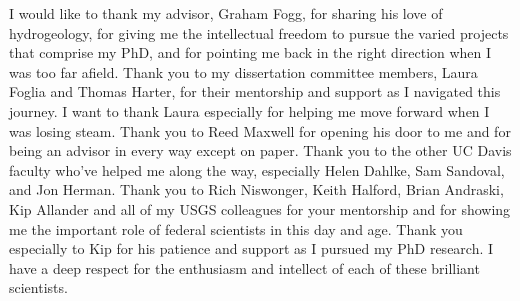 \begin{frontmatter}
\maketitle

\copyrightpage


\tableofcontents
\listoffigures
\listoftables

    \newpage
    \begin{inlineabstract}
		\myabstract
		
    \end{inlineabstract}

\begin{acknowledgments}
I would like to thank my advisor, Graham Fogg, for sharing his love of hydrogeology, for giving me the intellectual freedom to pursue the varied projects that comprise my PhD, and for pointing me back in the right direction when I was too far afield. Thank you to my dissertation committee members, Laura Foglia and Thomas Harter, for their mentorship and support as I navigated this journey. I want to thank Laura especially for helping me move forward when I was losing steam. Thank you to Reed Maxwell for opening his door to me and for being an advisor in every way except on paper. Thank you to the other UC Davis faculty who've helped me along the way, especially Helen Dahlke, Sam Sandoval, and Jon Herman. Thank you to Rich Niswonger, Keith Halford, Brian Andraski, Kip Allander and all of my USGS colleagues for your mentorship and for showing me the important role of federal scientists in this day and age. Thank you especially to Kip for his patience and support as I pursued my PhD research. I have a deep respect for the enthusiasm and intellect of each of these brilliant scientists.


\end{acknowledgments}
\end{frontmatter}
